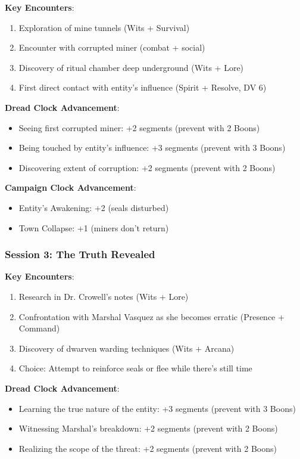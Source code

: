 \documentclass[11pt]{article}
\begin{document}
\textbf{Key Encounters}:
\begin{enumerate}[leftmargin=*]
\item Exploration of mine tunnels (Wits + Survival)
\item Encounter with corrupted miner (combat + social)
\item Discovery of ritual chamber deep underground (Wits + Lore)
\item First direct contact with entity's influence (Spirit + Resolve, DV 6)
\end{enumerate}

\textbf{Dread Clock Advancement}: 
\begin{itemize}[leftmargin=*]
\item Seeing first corrupted miner: +2 segments (prevent with 2 Boons)
\item Being touched by entity's influence: +3 segments (prevent with 3 Boons)
\item Discovering extent of corruption: +2 segments (prevent with 2 Boons)
\end{itemize}

\textbf{Campaign Clock Advancement}:
\begin{itemize}[leftmargin=*]
\item Entity's Awakening: +2 (seals disturbed)
\item Town Collapse: +1 (miners don't return)
\end{itemize}

\subsubsection*{Session 3: The Truth Revealed}

\textbf{Key Encounters}:
\begin{enumerate}[leftmargin=*]
\item Research in Dr. Crowell's notes (Wits + Lore)
\item Confrontation with Marshal Vasquez as she becomes erratic (Presence + Command)
\item Discovery of dwarven warding techniques (Wits + Arcana)
\item Choice: Attempt to reinforce seals or flee while there's still time
\end{enumerate}

\textbf{Dread Clock Advancement}: 
\begin{itemize}[leftmargin=*]
\item Learning the true nature of the entity: +3 segments (prevent with 3 Boons)
\item Witnessing Marshal's breakdown: +2 segments (prevent with 2 Boons)
\item Realizing the scope of the threat: +2 segments (prevent with 2 Boons)
\end{itemize}
\end{document}
